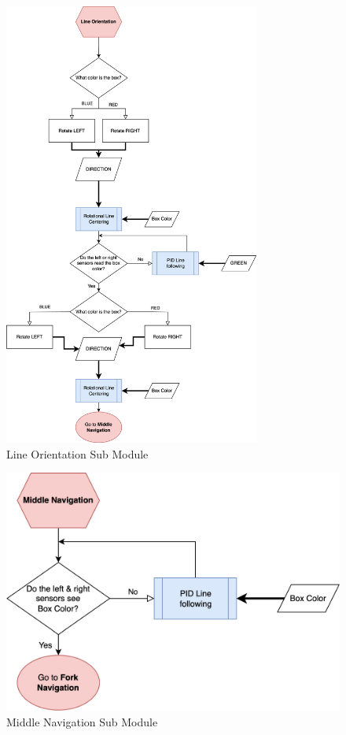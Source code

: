 \documentclass[12pt]{report}
\begin{document}
\begin{figure}[H]
    \centering
    \includegraphics[width=0.75\textwidth]{Images/flowchart/line_orientation.pdf}
    \caption{Line Orientation Sub Module}
    \label{fig:fc:line-orientation}
\end{figure}

\begin{figure}[H]
    \centering
    \includegraphics[width=1\textwidth]{Images/flowchart/middle_navigation.pdf}
    \caption{Middle Navigation Sub Module}
    \label{fig:fc:middle-navigation}
\end{figure}
\end{document}
